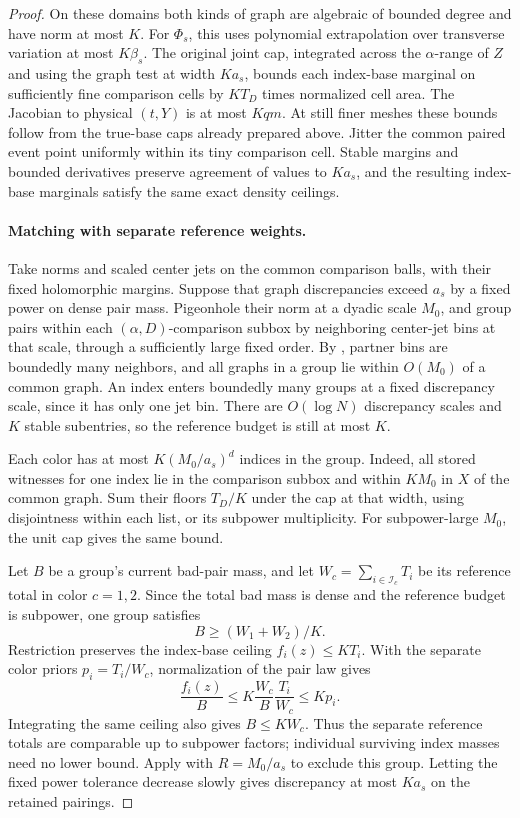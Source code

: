 \begin{proof}
On these domains both kinds of graph are algebraic of bounded
degree and have norm at most \(K\).  For \(\Phi_s\), this uses
polynomial extrapolation over transverse variation at most
\(K\beta_s\).  The original joint cap, integrated across the
\(\alpha\)-range of \(Z\) and using the graph test at width
\(Ka_s\), bounds each index-base marginal on sufficiently fine
comparison cells by \(KT_D\) times normalized cell area.  The
Jacobian to physical \((t,Y)\) is at most \(Kqm\).
At still finer meshes these bounds follow from the true-base caps
already prepared above.  Jitter the common paired event point
uniformly within its tiny comparison cell.  Stable margins and
bounded derivatives preserve agreement of values to \(Ka_s\),
and the resulting index-base marginals satisfy the same exact
density ceilings.

\paragraph{Matching with separate reference weights.}
Take norms and scaled center jets on the common comparison balls,
with their fixed holomorphic margins.  Suppose that graph discrepancies
exceed \(a_s\) by a fixed power
on dense pair mass.  Pigeonhole their norm at a dyadic scale
\(M_0\), and group pairs within each \((\alpha,D)\)-comparison
subbox by neighboring center-jet bins at that scale, through a
sufficiently large fixed order.  By ,
partner bins are boundedly many neighbors, and all graphs in a
group lie within \(O(M_0)\) of a common graph.  An index enters
boundedly many groups at a fixed discrepancy scale, since it has
only one jet bin.  There are \(O(\log N)\) discrepancy scales and
\(K\) stable subentries, so the reference budget is still at most
\(K\).

Each color has at most \(K(M_0/a_s)^d\) indices in the group.
Indeed, all stored witnesses for one index lie in the comparison
subbox and within \(KM_0\) in \(X\) of the common graph.  Sum
their floors \(T_D/K\) under the cap at that width, using
disjointness within each list, or its subpower multiplicity.
For subpower-large \(M_0\), the unit cap gives the same bound.

Let \(B\) be a group's current bad-pair mass, and let
\(W_c=\sum_{i\in\mathcal I_c}T_i\) be its reference total in
color \(c=1,2\).  Since the total bad mass is dense and the
reference budget is subpower, one group satisfies
\[
 B\ge (W_1+W_2)/K.
\]
Restriction preserves the index-base ceiling \(f_i(z)\le KT_i\).
With the separate color priors \(p_i=T_i/W_c\), normalization of
the pair law gives
\[
 \frac{f_i(z)}{B}
 \le K\frac{W_c}{B}\frac{T_i}{W_c}\le Kp_i.
\]
Integrating the same ceiling also gives \(B\le KW_c\).
Thus the separate reference totals are comparable up to subpower
factors; individual surviving index masses need no lower bound.
Apply  with \(R=M_0/a_s\) to
exclude this group.  Letting the fixed power tolerance decrease
slowly gives discrepancy at most \(Ka_s\) on the retained pairings.


\end{proof}
